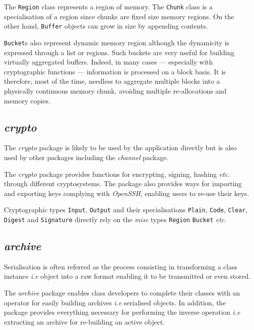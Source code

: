 \documentclass[10pt,a4wide]{article}
\newcommand\ie[0]{\textit{i.e}}
\newcommand\etc[0]{\textit{etc.}}
\begin{document}
The \texttt{Region} class represents a region of memory. The \texttt{Chunk}
class is a specialisation of a region since chunks are fixed size memory
regions. On the other hand, \texttt{Buffer} objects can grow in size by
appending contents.

\texttt{Bucket}s also represent dynamic memory region although the dynamicity
is expressed through a list or regions. Such buckets are very useful for
building virtually aggregated buffers. Indeed, in many cases --- especially
with cryptographic functions --- information is processed on a block basis.
It is therefore, most of the time, needless to aggregate multiple blocks
into a physically continuous memory chunk, avoiding multiple re-allocations
and memory copies.

%
%

\subsection{\textit{crypto}}

The \textit{crypto} package is likely to be used by the application directly
but is also used by other packages including the \textit{channel} package.

The \textit{crypto} package provides functions for encrypting, signing,
hashing \etc{} through different cryptosystems. The package also provides
ways for importing and exporting keys complying with \textit{OpenSSH}, enabling
users to re-use their keys.

Cryptographic types \texttt{Input}, \texttt{Output} and their specialisations
\texttt{Plain}, \texttt{Code}, \texttt{Clear}, \texttt{Digest} and
\texttt{Signature} directly rely on the \textit{misc} types \texttt{Region}
\texttt{Bucket} \etc{}

%
%

\subsection{\textit{archive}}

Serialisation is often referred as the process consisting in transforming
a class instance \ie{} object into a raw format enabling it to be transmitted
or even stored.

The \textit{archive} package enables class developers to complete their classes
with an operator for easily building archives \ie{} serialised objects. In
addition, the package provides everything necessary for performing the
inverse operation \ie{} extracting an archive for re-building an active
object.
\end{document}

